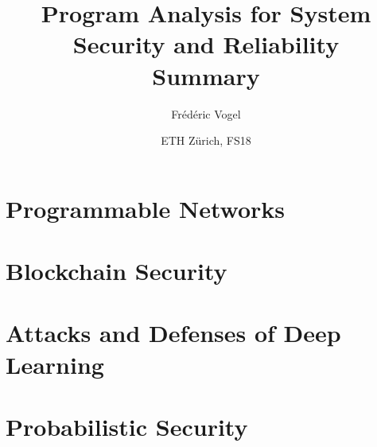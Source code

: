 \documentclass[10pt,a4paper]{article}
\title{Program Analysis for System Security and Reliability\\Summary}
\author{Frédéric Vogel}
\date{ETH Zürich, FS18}
\begin{document}
\maketitle

\tableofcontents

\pagebreak

\section{Programmable Networks}




\section{Blockchain Security}

\section{Attacks and Defenses of Deep Learning}

\section{Probabilistic Security}
\end{document}
